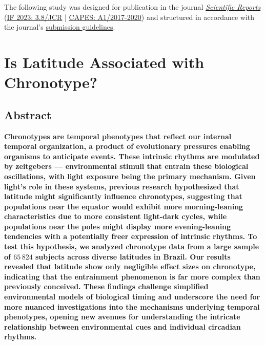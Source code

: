 \documentclass[
12pt,
openright,
oneside,
a4paper,
chapter=TITLE,
section=TITLE,
french,
spanish,
brazil,
english
]{abntex2}\usepackage{array}
\newlength{\hugeskipamount}
\begin{document}
\newpage

\null\vfill

\begingroup
{}
\noindent The following study was designed for publication in the journal \href{https://www.nature.com/srep/}{\textit{Scientific Reports}} (\href{https://jcr.clarivate.com/jcr}{IF 2023: 3.8/JCR} | \href{https://sucupira-legado.capes.gov.br/sucupira/}{CAPES: A1/2017-2020}) and structured in accordance with the journal's \href{https://www.nature.com/srep/author-instructions/submission-guidelines}{submission guidelines}.
\endgroup

\vspace{\hugeskipamount}


\chapter{Is Latitude Associated with
Chronotype?}\label{is-latitude-associated-with-chronotype}

\section{Abstract}\label{abstract}

\noindent \textbf{Chronotypes are temporal phenotypes that reflect our
internal temporal organization, a product of evolutionary pressures
enabling organisms to anticipate events. These intrinsic rhythms are
modulated by zeitgebers --- environmental stimuli that entrain these
biological oscillations, with light exposure being the primary
mechanism. Given light's role in these systems, previous research
hypothesized that latitude might significantly influence chronotypes,
suggesting that populations near the equator would exhibit more
morning-leaning characteristics due to more consistent light-dark
cycles, while populations near the poles might display more
evening-leaning tendencies with a potentially freer expression of
intrinsic rhythms. To test this hypothesis, we analyzed chronotype data
from a large sample of \(65\,824\) subjects across diverse latitudes in
Brazil. Our results revealed that latitude show only negligible effect
sizes on chronotype, indicating that the entrainment phenomenon is far
more complex than previously conceived. These findings challenge
simplified environmental models of biological timing and underscore the
need for more nuanced investigations into the mechanisms underlying
temporal phenotypes, opening new avenues for understanding the intricate
relationship between environmental cues and individual circadian
rhythms.}
\end{document}
